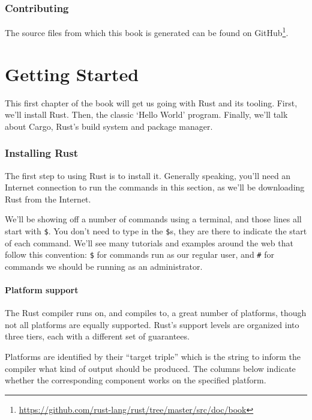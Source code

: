 \documentclass[a4paper,]{book}
\renewcommand*{\hypertarget}[3][\ar]{%
  \def\ar{#2}%
  \label{#1}%
  #3}
\renewcommand{\href}[2]{#2\footnote{\url{#1}}}
\begin{document}
\subsection{Contributing}\label{contributing}

The source files from which this book is generated can be found on
\href{https://github.com/rust-lang/rust/tree/master/src/doc/book}{GitHub}.

\hypertarget{sec--getting-started}{\chapter{Getting
Started}\label{sec--getting-started}}

This first chapter of the book will get us going with Rust and its
tooling. First, we'll install Rust. Then, the classic `Hello World'
program. Finally, we'll talk about Cargo, Rust's build system and
package manager.

\subsection{Installing Rust}\label{installing-rust}

The first step to using Rust is to install it. Generally speaking,
you'll need an Internet connection to run the commands in this section,
as we'll be downloading Rust from the Internet.

We'll be showing off a number of commands using a terminal, and those
lines all start with \texttt{\$}. You don't need to type in the
\texttt{\$}s, they are there to indicate the start of each command.
We'll see many tutorials and examples around the web that follow this
convention: \texttt{\$} for commands run as our regular user, and
\texttt{\#} for commands we should be running as an administrator.

\subsubsection{Platform support}\label{platform-support}

The Rust compiler runs on, and compiles to, a great number of platforms,
though not all platforms are equally supported. Rust's support levels
are organized into three tiers, each with a different set of guarantees.

Platforms are identified by their ``target triple'' which is the string
to inform the compiler what kind of output should be produced. The
columns below indicate whether the corresponding component works on the
specified platform.
\end{document}
